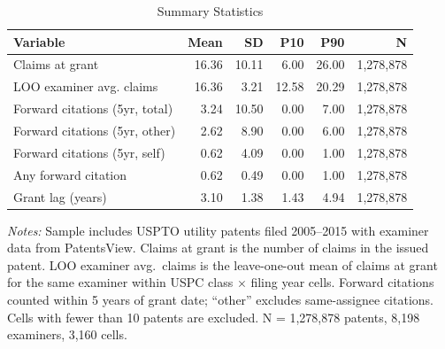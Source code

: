 \begin{table}[htbp]
\centering
\caption{Summary Statistics}
\label{tab:summary}
\small
\begin{tabular}{lrrrrr}
\hline\hline
Variable & Mean & SD & P10 & P90 & N \\
\hline
Claims at grant & 16.36 & 10.11 & 6.00 & 26.00 & 1,278,878 \\
LOO examiner avg. claims & 16.36 & 3.21 & 12.58 & 20.29 & 1,278,878 \\
Forward citations (5yr, total) & 3.24 & 10.50 & 0.00 & 7.00 & 1,278,878 \\
Forward citations (5yr, other) & 2.62 & 8.90 & 0.00 & 6.00 & 1,278,878 \\
Forward citations (5yr, self) & 0.62 & 4.09 & 0.00 & 1.00 & 1,278,878 \\
Any forward citation & 0.62 & 0.49 & 0.00 & 1.00 & 1,278,878 \\
Grant lag (years) & 3.10 & 1.38 & 1.43 & 4.94 & 1,278,878 \\
\hline\hline
\end{tabular}
\begin{tablenotes}
\small
\item \textit{Notes:} Sample includes USPTO utility patents filed 2005--2015 with examiner data from PatentsView. Claims at grant is the number of claims in the issued patent. LOO examiner avg.\ claims is the leave-one-out mean of claims at grant for the same examiner within USPC class $\times$ filing year cells. Forward citations counted within 5 years of grant date; ``other'' excludes same-assignee citations. Cells with fewer than 10 patents are excluded. N = 1,278,878 patents, 8,198 examiners, 3,160 cells.
\end{tablenotes}
\end{table}
